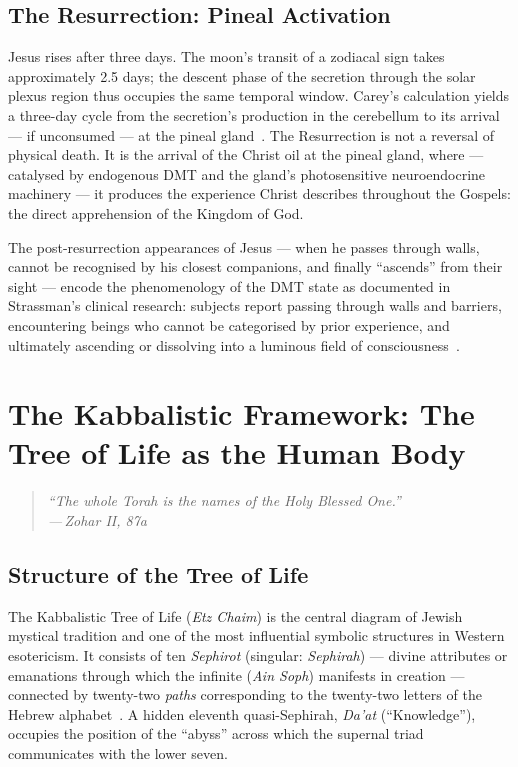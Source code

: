 \documentclass[12pt, a4paper]{article}
\newcommand{\epigraph}[2]{%
  \begin{quote}
    \itshape ``#1''\\[0.3em]
    \normalfont\small\hfill ---\,#2
  \end{quote}
}
\begin{document}
\subsection{The Resurrection: Pineal Activation}

Jesus rises after three days. The moon's transit of a zodiacal sign takes
approximately 2.5 days; the descent phase of the secretion through the solar
plexus region thus occupies the same temporal window. Carey's
calculation yields a three-day cycle from the secretion's production in the
cerebellum to its arrival — if unconsumed — at the pineal
gland~\autocite[107]{carey1932}. The Resurrection is not a reversal of
physical death. It is the arrival of the Christ oil at the pineal gland,
where — catalysed by endogenous DMT and the gland's photosensitive
neuroendocrine machinery — it produces the experience Christ describes
throughout the Gospels: the direct apprehension of the Kingdom of God.

The post-resurrection appearances of Jesus — when he passes through walls,
cannot be recognised by his closest companions, and finally ``ascends'' from
their sight — encode the phenomenology of the DMT state as documented in
Strassman's clinical research: subjects report passing through walls and
barriers, encountering beings who cannot be categorised by prior experience,
and ultimately ascending or dissolving into a luminous field of
consciousness~\autocite[186]{strassman2001}.

\section{The Kabbalistic Framework: The Tree of Life as the Human Body}
\label{sec:kabbalah}

\epigraph{The whole Torah is the names of the Holy Blessed One.}{Zohar II,
87a}

\subsection{Structure of the Tree of Life}

The Kabbalistic Tree of Life (\emph{Etz Chaim}) is the central diagram of
Jewish mystical tradition and one of the most influential symbolic structures
in Western esotericism. It consists of ten \emph{Sephirot} (singular:
\emph{Sephirah}) — divine attributes or emanations through which the infinite
(\emph{Ain Soph}) manifests in creation — connected by twenty-two
\emph{paths} corresponding to the twenty-two letters of the Hebrew
alphabet~\autocite[106]{scholem1974}. A hidden eleventh quasi-Sephirah,
\emph{Da'at} (``Knowledge''), occupies the position of the ``abyss'' across
which the supernal triad communicates with the lower seven.
\end{document}
